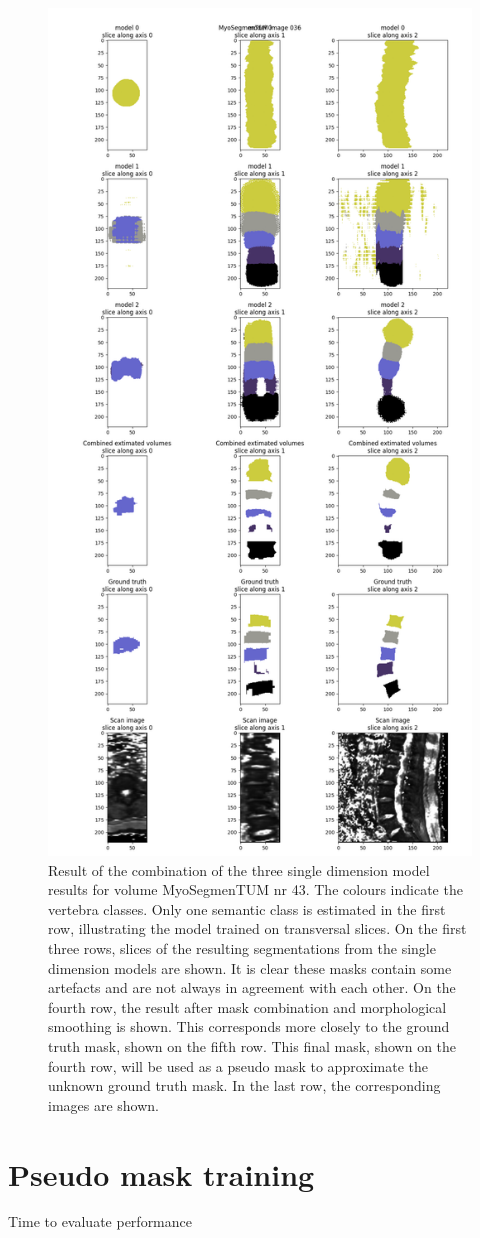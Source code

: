 \begin{figure}
    \centering
    \includegraphics[width=.95\textwidth]{images/morphmask_denoise1_erode1_MyoSegmenTUM_036.png}
    \caption{
        Result of the combination of the three single dimension model results for volume MyoSegmenTUM nr 43.
        The colours indicate the vertebra classes. Only one semantic class is estimated in the first row, illustrating the model trained on transversal slices.
        On the first three rows, slices of the resulting segmentations from the single dimension models are shown. 
        It is clear these masks contain some artefacts and are not always in agreement with each other.
        On the fourth row, the result after mask combination and morphological smoothing is shown. 
        This corresponds more closely to the ground truth mask, shown on the fifth row.
        This final mask, shown on the fourth row, will be used as a pseudo mask to approximate the unknown ground truth mask.
        In the last row, the corresponding images are shown.
    }
\end{figure}

\chapter{Pseudo mask training}

Time to evaluate
performance
